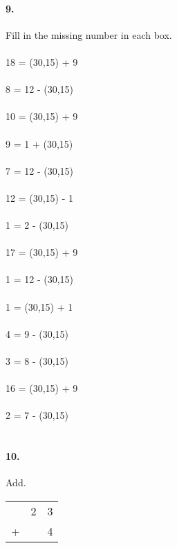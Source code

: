 \documentclass[12pt]{article}
\begin{document}
\paragraph{9.}
Fill in the missing number in each box. \\
\\
18 = \framebox(30,15){} + 9
\\
\\
8 = 12 - \framebox(30,15){}
\\
\\
10 = \framebox(30,15){} + 9
\\
\\
9 = 1 + \framebox(30,15){}
\\
\\
7 = 12 - \framebox(30,15){}
\\
\\
12 = \framebox(30,15){} - 1
\\
\\
1 = 2 - \framebox(30,15){}
\\
\\
17 = \framebox(30,15){} + 9
\\
\\
1 = 12 - \framebox(30,15){}
\\
\\
1 = \framebox(30,15){} + 1
\\
\\
4 = 9 - \framebox(30,15){}
\\
\\
3 = 8 - \framebox(30,15){}
\\
\\
16 = \framebox(30,15){} + 9
\\
\\
2 = 7 - \framebox(30,15){}
\\
\\

\newpage

\paragraph{10.}
Add. \\
\bigskip

\begin{tabular}{c@{\,}c@{\,}c}
  & 2 & 3 \\
+ &   & 4 \\
\hline
\end{tabular}

\bigskip
\bigskip
\bigskip
\end{document}
